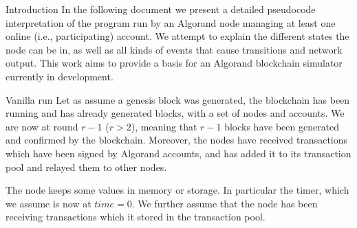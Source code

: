 \documentclass[10pt,a4paper]{article}
\begin{document}
\begin{section}{Introduction}
In the following document we present a detailed pseudocode interpretation 
of the program run by an Algorand node managing at least one online (i.e., 
participating) account. We attempt to explain the different states the node 
can be in, as well as all kinds of events that cause transitions and network 
output. This work aims to provide a basis for an Algorand blockchain simulator 
currently in development. 

\begin{subsection}{Vanilla run}\label{subsect:vanilla-run}
Let as assume a genesis block was generated, the blockchain has been running and
has already generated blocks, with a set of nodes and accounts. 
We are now at round $r-1$ ($r>2$), meaning
that $r-1$ blocks have been generated and confirmed by the blockchain.
Moreover, the nodes have received transactions which have been signed 
by Algorand accounts, and has added it to its transaction pool and 
relayed them to other nodes.

The node keeps some values in memory or storage. In particular the 
timer,
which we assume is now at $time=0$. We further assume that the node
has been receiving transactions which it stored in the transaction pool. 


\end{subsection}
\end{section}
\end{document}
